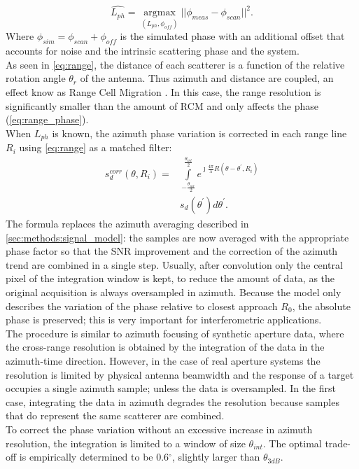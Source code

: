 \begin{equation}\label{eq:rph_estimation}
	\hat{L_{ph}} = \underset{\left(L_{ph}, \phi_{off}\right)}{\operatorname{argmax}}{\vert\vert\phi_{meas} - \phi_{scan}\vert\vert}^2.
\end{equation}
Where $\phi_{sim} = \phi_{scan} + \phi_{off}$ is the simulated phase with an additional offset that accounts for noise and the intrinsic scattering phase and the system.\\
As seen in \autoref{eq:range}, the distance of each scatterer is a function of the relative rotation angle $\theta_r$ of the antenna. Thus azimuth and distance are coupled, an effect know as Range Cell Migration . In this case, the range resolution is significantly smaller than the amount of RCM and only affects the phase (\autoref{eq:range_phase}).\\
When $L_{ph}$ is known, the azimuth phase variation is corrected in each range line $R_{i}$ using \autoref{eq:range} as a matched filter:
\begin{equation}\label{eq:correction}
	\begin{aligned}
		s_{d}^{corr}\left(\theta, R_{i}\right) = &\int\limits_{-\frac{\theta_{int}}{2}}^{\frac{\theta_{int}}{2}}e^{\jmath \frac{4\pi}{\lambda}R\left(\theta - \theta^{\prime}, R_{i}\right)}\\
		&s_{d}\left(\theta^\prime\right) d\theta^\prime.
	\end{aligned}
\end{equation}
The formula replaces the azimuth averaging described in \autoref{sec:methods:signal_model}: the samples are now averaged with the appropriate phase factor so that the SNR improvement and the correction of the azimuth trend are combined in a single step. Usually, after convolution only the central pixel of the integration window is kept, to reduce the amount of data, as the original acquisition is always oversampled in azimuth. Because the model only describes the variation of the phase relative to closest approach $R_{0}$, the absolute phase is preserved; this is very important for interferometric applications.\\
The procedure is similar to azimuth focusing of synthetic aperture data, where the cross-range resolution is obtained by the integration of the data in the azimuth-time direction. However, in the case of real aperture systems the resolution is limited by physical antenna beamwidth and the response of a target  occupies a single azimuth sample; unless the data is oversampled. In the first case, integrating the data in azimuth degrades the resolution because samples that do represent the same scatterer are combined.\\ To correct the phase variation without an excessive increase in azimuth resolution, the integration is limited to a window of size $\theta_{int}$. The optimal trade-off is empirically determined to be 0.6$^\circ$, slightly larger than $\theta_{3dB}$.
